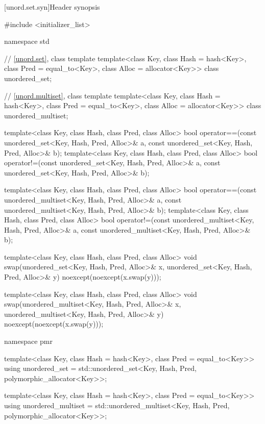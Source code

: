 [unord.set.syn]{Header  synopsis}%
%
%
%
\begin{codeblock}
#include <initializer_list>

namespace std {
  // \ref{unord.set}, class template 
  template<class Key,
           class Hash = hash<Key>,
           class Pred = equal_to<Key>,
           class Alloc = allocator<Key>>
    class unordered_set;

  // \ref{unord.multiset}, class template 
  template<class Key,
           class Hash = hash<Key>,
           class Pred = equal_to<Key>,
           class Alloc = allocator<Key>>
    class unordered_multiset;

  template<class Key, class Hash, class Pred, class Alloc>
    bool operator==(const unordered_set<Key, Hash, Pred, Alloc>& a,
                    const unordered_set<Key, Hash, Pred, Alloc>& b);
  template<class Key, class Hash, class Pred, class Alloc>
    bool operator!=(const unordered_set<Key, Hash, Pred, Alloc>& a,
                    const unordered_set<Key, Hash, Pred, Alloc>& b);

  template<class Key, class Hash, class Pred, class Alloc>
    bool operator==(const unordered_multiset<Key, Hash, Pred, Alloc>& a,
                    const unordered_multiset<Key, Hash, Pred, Alloc>& b);
  template<class Key, class Hash, class Pred, class Alloc>
    bool operator!=(const unordered_multiset<Key, Hash, Pred, Alloc>& a,
                    const unordered_multiset<Key, Hash, Pred, Alloc>& b);

  template<class Key, class Hash, class Pred, class Alloc>
    void swap(unordered_set<Key, Hash, Pred, Alloc>& x,
              unordered_set<Key, Hash, Pred, Alloc>& y)
      noexcept(noexcept(x.swap(y)));

  template<class Key, class Hash, class Pred, class Alloc>
    void swap(unordered_multiset<Key, Hash, Pred, Alloc>& x,
              unordered_multiset<Key, Hash, Pred, Alloc>& y)
      noexcept(noexcept(x.swap(y)));

  namespace pmr {
    template<class Key,
             class Hash = hash<Key>,
             class Pred = equal_to<Key>>
      using unordered_set = std::unordered_set<Key, Hash, Pred,
                                               polymorphic_allocator<Key>>;

    template<class Key,
             class Hash = hash<Key>,
             class Pred = equal_to<Key>>
      using unordered_multiset = std::unordered_multiset<Key, Hash, Pred,
                                                         polymorphic_allocator<Key>>;
  }
}
\end{codeblock}

